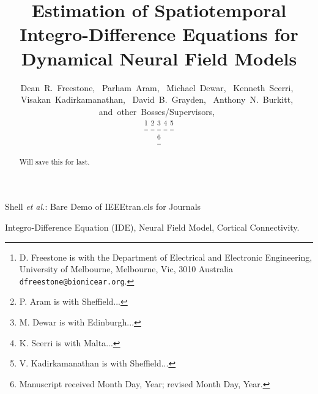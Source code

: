 \documentclass[onecolumn,draftcls]{IEEEtran}
\begin{document}
\title{Estimation of Spatiotemporal Integro-Difference Equations for Dynamical Neural Field Models}

\author{Dean~R.~Freestone,~
        Parham~Aram,~
        Michael~Dewar,~
        Kenneth~Scerri,~
        Visakan~Kadirkamanathan,~
        David~B.~Grayden,~
        Anthony~N.~Burkitt,~
        and~other~Bosses/Supervisors,~%

\thanks{D. Freestone is with the Department
of Electrical and Electronic Engineering, University of Melbourne, Melbourne,
Vic, 3010 Australia {\tt\small dfreestone@bionicear.org}.}%
\thanks{P. Aram is with Sheffield...}
\thanks{M. Dewar is with Edinburgh...}
\thanks{K. Scerri is with Malta...}
\thanks{V. Kadirkamanathan is with Sheffield...}

\thanks{Manuscript received Month Day, Year; revised Month Day, Year.}}


%
{Shell \MakeLowercase{\textit{et al.}}: Bare Demo of IEEEtran.cls for Journals}

\maketitle

\begin{abstract}
Will save this for last.
\end{abstract}


\begin{IEEEkeywords}
Integro-Difference Equation (IDE), Neural Field Model, Cortical Connectivity.
\end{IEEEkeywords}

\IEEEpeerreviewmaketitle
\end{document}
